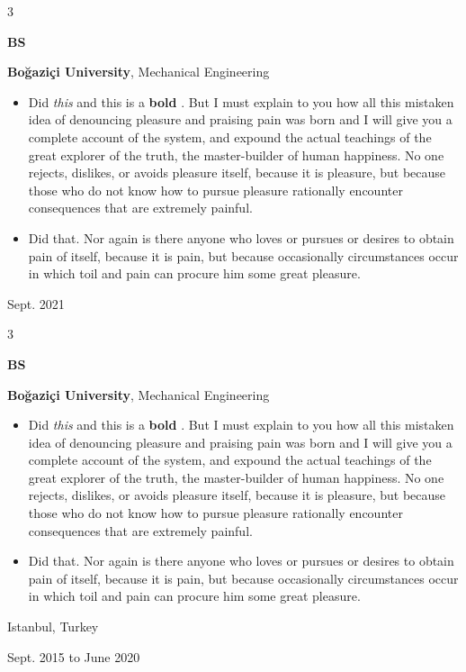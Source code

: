 \documentclass[10pt, letterpaper]{article}
\newenvironment{highlights}{
    \begin{itemize}[
        topsep=0.10 cm,
        parsep=0.10 cm,
        partopsep=0pt,
        itemsep=0pt,
        leftmargin=0.4 cm + 10pt
    ]
}{
    \end{itemize}
} %
\newenvironment{threecolentry}[3][]{
    \onecolentry
    \def\thirdColumn{#3}
    \setcolumnwidth{1 cm, \fill, 4.5 cm}
    \begin{paracol}{3}
    {\raggedright #2} \switchcolumn
}{
    \switchcolumn \raggedleft \thirdColumn
    \end{paracol}
    \endonecolentry
} %
\let\hrefWithoutArrow\href
\renewcommand{\href}[2]{\hrefWithoutArrow{#1}{\mbox{\ifthenelse{\equal{#2}{}}{ }{#2 }\raisebox{.15ex}{\footnotesize \faExternalLink*}}}}
\begin{document}
        \vspace{0.2 cm}

        \begin{threecolentry}{\textbf{BS}}{
            Sept. 2021
        }
            \textbf{Boğaziçi University}, Mechanical Engineering
            \begin{highlights}
                \item Did \textit{this} and this is a \textbf{bold} \href{https://example.com}{link}. But I must explain to you how all this mistaken idea of denouncing pleasure and praising pain was born and I will give you a complete account of the system, and expound the actual teachings of the great explorer of the truth, the master-builder of human happiness. No one rejects, dislikes, or avoids pleasure itself, because it is pleasure, but because those who do not know how to pursue pleasure rationally encounter consequences that are extremely painful.
                \item Did that. Nor again is there anyone who loves or pursues or desires to obtain pain of itself, because it is pain, but because occasionally circumstances occur in which toil and pain can procure him some great pleasure.
            \end{highlights}
        \end{threecolentry}

        \vspace{0.2 cm}

        \begin{threecolentry}{\textbf{BS}}{
            Istanbul, Turkey

        Sept. 2015 to June 2020
        }
            \textbf{Boğaziçi University}, Mechanical Engineering
            \begin{highlights}
                \item Did \textit{this} and this is a \textbf{bold} \href{https://example.com}{link}. But I must explain to you how all this mistaken idea of denouncing pleasure and praising pain was born and I will give you a complete account of the system, and expound the actual teachings of the great explorer of the truth, the master-builder of human happiness. No one rejects, dislikes, or avoids pleasure itself, because it is pleasure, but because those who do not know how to pursue pleasure rationally encounter consequences that are extremely painful.
                \item Did that. Nor again is there anyone who loves or pursues or desires to obtain pain of itself, because it is pain, but because occasionally circumstances occur in which toil and pain can procure him some great pleasure.
            \end{highlights}
        \end{threecolentry}
\end{document}
